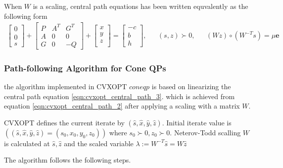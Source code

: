 When $W$ is a scaling, central path equations has been written equvalently as the following form
\begin{equation}
	\begin{aligned}
		\begin{bmatrix}
			0\\
			0\\
			s
		\end{bmatrix}
		+
		\begin{bmatrix}
			P & A^T & G^T\\
			A & 0 & 0\\
			G & 0 & -Q
		\end{bmatrix}
		+\begin{bmatrix}
			x\\
			y\\
			z\\
		\end{bmatrix}
		=
		\begin{bmatrix}
			-c\\
			b\\
			h
		\end{bmatrix}
		,
		& & (s,z)\succ 0, & & (Wz)\circ (W^{-T}s) = \mu \textbf{e}
	\end{aligned}
	\label{eqn:cvxopt_central_path_3}
\end{equation}

\subsubsection*{Path-following Algorithm for Cone QPs}

the algorithm implemented in CVXOPT $coneqp$ is based on linearizing the central path equation \ref{eqn:cvxopt_central_path_3}. which is achieved from equation \ref{eqn:cvxopt_central_path_2} after applying a scaling with a matrix $W$.

CVXOPT defines the current iterate by $(\hat{s},\hat{x},\hat{y},\hat{z})$. Initial iterate value is $((\hat{s},\hat{x},\hat{y},\hat{z})=(s_0,x_0,y_0,z_0))$ where $s_0\succ 0,z_0 \succ 0$. Neterov-Todd scalling $W$ is calculated at $\hat{s},\hat{z}$ and the scaled variable $\lambda := W^{-T}\hat{s} = W\hat{z}$

The algorithm follows the following steps.






































